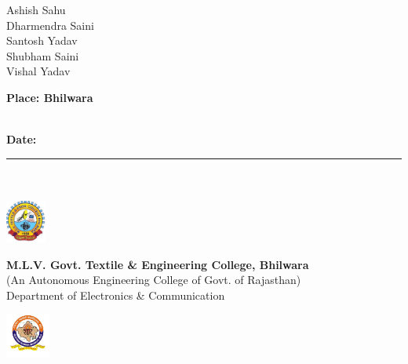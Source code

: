 \documentclass[twoside,a4paper,16pt]{book}
\begin{document}
{{ Ashish Sahu\\
 Dharmendra Saini\\
 Santosh Yadav\\
 Shubham Saini\\
 Vishal Yadav\\\vspace{2cm}

 {\bf Place: Bhilwara }\\\\
{\bf Date: {\rule{20mm}{0.2mm}} } 
}
\newpage
\noindent%
\\
\\
\includegraphics[width=0.10\textwidth]{logo.jpg}%
\begin{minipage}[b]{0.8\textwidth}
	\centering
	{\large {\bf M.L.V. Govt. Textile \& Engineering College, Bhilwara} }\\
	(An Autonomous Engineering College of Govt. of Rajasthan)\\
	Department of Electronics \& Communication
\end{minipage}%
\includegraphics[width=0.11\textwidth]{rtu.png}\\
\\

}
\end{document}
